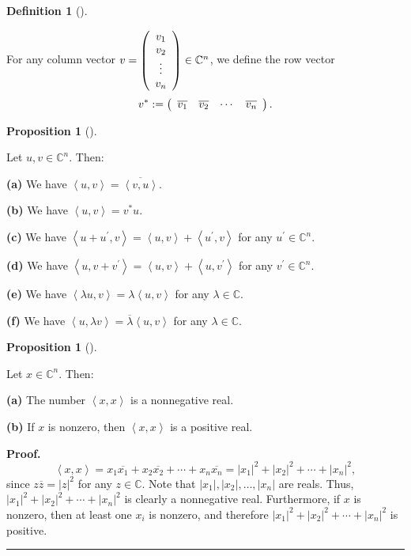 \documentclass[numbers=enddot,12pt,final,onecolumn,notitlepage]{scrartcl}%
\numberwithin{exer}{subsection}
\theoremstyle{definition}
\newtheorem{prop}[theo]{Proposition}
\newenvironment{proposition}[1][]
{\begin{prop}[#1]\begin{leftbar}}
{\end{leftbar}\end{prop}}
\newtheorem{defi}[theo]{Definition}
\newenvironment{definition}[1][]
{\begin{defi}[#1]\begin{leftbar}}
{\end{leftbar}\end{defi}}
\newenvironment{proof}[1][Proof]{\noindent\textbf{#1.} }{\ \rule{0.5em}{0.5em}}
\begin{document}
\begin{definition}
For any column vector $v=\left(
\begin{array}
[c]{c}%
v_{1}\\
v_{2}\\
\vdots\\
v_{n}%
\end{array}
\right)  \in\mathbb{C}^{n}$, we define the row vector%
\[
v^{\ast}:=\left(
\begin{array}
[c]{cccc}%
\overline{v_{1}} & \overline{v_{2}} & \cdots & \overline{v_{n}}%
\end{array}
\right)  .
\]

\end{definition}

\begin{proposition}
Let $u,v\in\mathbb{C}^{n}$. Then:

\textbf{(a)} We have $\left\langle u,v\right\rangle =\overline{\left\langle
v,u\right\rangle }$.

\textbf{(b)} We have $\left\langle u,v\right\rangle =v^{\ast}u$.

\textbf{(c)} We have $\left\langle u+u^{\prime},v\right\rangle =\left\langle
u,v\right\rangle +\left\langle u^{\prime},v\right\rangle $ for any $u^{\prime
}\in\mathbb{C}^{n}$.

\textbf{(d)} We have $\left\langle u,v+v^{\prime}\right\rangle =\left\langle
u,v\right\rangle +\left\langle u,v^{\prime}\right\rangle $ for any $v^{\prime
}\in\mathbb{C}^{n}$.

\textbf{(e)} We have $\left\langle \lambda u,v\right\rangle =\lambda
\left\langle u,v\right\rangle $ for any $\lambda\in\mathbb{C}$.

\textbf{(f)} We have $\left\langle u,\lambda v\right\rangle =\overline
{\lambda}\left\langle u,v\right\rangle $ for any $\lambda\in\mathbb{C}$.
\end{proposition}

\begin{proposition}
Let $x\in\mathbb{C}^{n}$. Then:

\textbf{(a)} The number $\left\langle x,x\right\rangle $ is a nonnegative real.

\textbf{(b)} If $x$ is nonzero, then $\left\langle x,x\right\rangle $ is a
positive real.
\end{proposition}

\begin{proof}%
\[
\left\langle x,x\right\rangle =x_{1}\overline{x_{1}}+x_{2}\overline{x_{2}%
}+\cdots+x_{n}\overline{x_{n}}=\left\vert x_{1}\right\vert ^{2}+\left\vert
x_{2}\right\vert ^{2}+\cdots+\left\vert x_{n}\right\vert ^{2},
\]
since $z\overline{z}=\left\vert z\right\vert ^{2}$ for any $z\in\mathbb{C}$.
Note that $\left\vert x_{1}\right\vert ,\left\vert x_{2}\right\vert
,\ldots,\left\vert x_{n}\right\vert $ are reals. Thus, $\left\vert
x_{1}\right\vert ^{2}+\left\vert x_{2}\right\vert ^{2}+\cdots+\left\vert
x_{n}\right\vert ^{2}$ is clearly a nonnegative real. Furthermore, if $x$ is
nonzero, then at least one $x_{i}$ is nonzero, and therefore $\left\vert
x_{1}\right\vert ^{2}+\left\vert x_{2}\right\vert ^{2}+\cdots+\left\vert
x_{n}\right\vert ^{2}$ is positive.
\end{proof}
\end{document}
